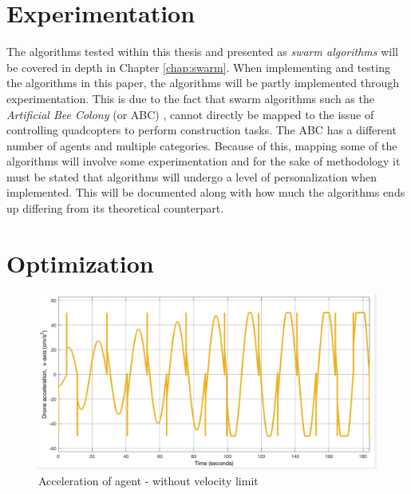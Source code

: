 \section{Experimentation}
The algorithms tested within this thesis and presented as \textit{swarm algorithms} will be covered in depth in Chapter \ref{chap:swarm}. When implementing and testing the algorithms in this paper, the algorithms will be partly implemented through experimentation. This is due to the fact that swarm algorithms such as the \textit{Artificial Bee Colony} (or ABC) \cite{bhattacharjee_multi-robot_2011}, cannot directly be mapped to the issue of controlling quadcopters to perform construction tasks. The ABC has a different number of agents and multiple categories. Because of this, mapping some of the algorithms will involve some experimentation and for the sake of methodology it must be stated that algorithms will undergo a level of personalization when implemented. This will be documented along with how much the algorithms ends up differing from its theoretical counterpart. 

\section{Optimization}



\begin{figure}[h!]
  \centering
  \includegraphics[width=.8\columnwidth]{figures/SA_accel_with_no_vel_limit.png}
  \caption{Acceleration of agent - without velocity limit}
  \label{fig:sa_accel_no_vel_adj}
\end{figure}






